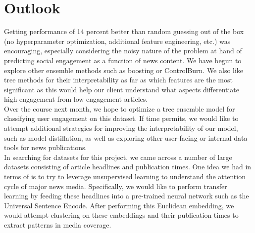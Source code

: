 \documentclass{article}
\begin{document}
\section{Outlook}

Getting performance of 14 percent better than random guessing out of the box (no hyperparameter optimization, additional feature engineering, etc.) was encouraging, especially considering the noisy nature of the problem at hand of predicting social engagement as a function of news content. We have begun to explore other ensemble methods such as boosting or ControlBurn. We also like tree methods for their interpretability as far as which features are the most significant as this would help our client understand what aspects differentiate high engagement from low engagement articles.\\

Over the course next month, we hope to optimize a tree ensemble model for classifying user engagement on this dataset. If time permits, we would like to attempt additional strategies for improving the interpretability of our model, such as model distillation, as well as exploring other user-facing or internal data tools for news publications. \\

In searching for datasets for this project, we came across a number of large datasets consisting of article headlines and publication times. One idea we had in terms of is to try to leverage unsupervised learning to understand the attention cycle of major news media. Specifically, we would like to perform transfer learning by feeding these headlines into a pre-trained neural network such as the Universal Sentence Encode. After performing this Euclidean embedding, we would attempt clustering on these embeddings and their publication times to extract patterns in media coverage. 
\end{document}
